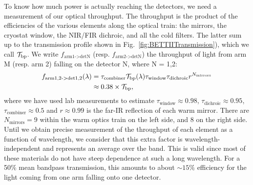To know how much power is actually reaching the detectors, we need a measurement of our optical throughput. The throughput is the product of the efficiencies of the various elements along the optical train: the mirrors, the cryostat window, the NIR/FIR dichroic, and all the cold filters. The latter sum up to the transmission profile shown in Fig.~\ref{fig:BETTIITransmission}), which we call $\mathcal{T}_\textrm{bp}$. We write $f_\textrm{arm1->detN}$ (resp. $f_\textrm{arm2->detN}$) the throughput of light from arm M (resp. arm 2) falling on the detector N, where N = {1,2}:
\begin{align}
f_\textrm{arm{1,2}->det{1,2}}(\lambda) &= \tau_\textrm{combiner}\mathcal{T}_\textrm{bp}(\lambda)\tau_\textrm{window}\tau_\textrm{dichroic}r^{N_\textrm{mirrors}} \\
& \approx 0.38\times \mathcal{T}_\textrm{bp},
\end{align}
where we have used lab measurements to estimate $\tau_\textrm{window}\approx 0.98$, $\tau_\textrm{dichroic}\approx 0.95$, $\tau_\textrm{combiner}\approx 0.5$ and $r\approx 0.99 $ is the far-IR reflection of each warm mirror. There are $N_\textrm{mirrors} = 9$ within the warm optics train on the left side, and 8 on the right side. Until we obtain precise measurement of the throughput of each element as a function of wavelength, we consider that this extra factor is wavelength-independent and represents an average over the band. This is valid since most of these materials do not have steep dependence at such a long wavelength. For a 50\% mean bandpass transmission, this amounts to about $\sim 15\%$ efficiency for the light coming from one arm falling onto one detector. 

